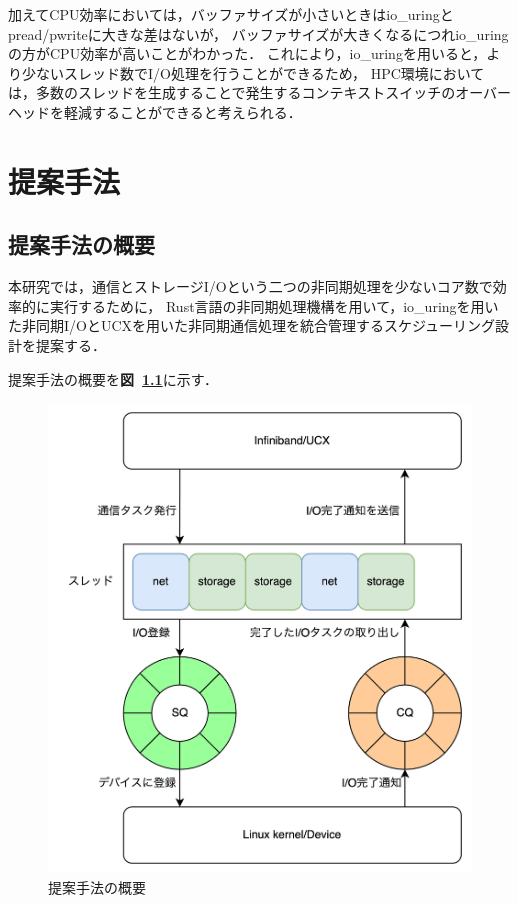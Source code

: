 \documentclass[a4paper,11pt,openany]{jreport}
\newcommand\figref[1]{\textbf{図~\ref{fig:#1}}}
\begin{document}
加えてCPU効率においては，バッファサイズが小さいときはio\_uringとpread/pwriteに大きな差はないが，
バッファサイズが大きくなるにつれio\_uringの方がCPU効率が高いことがわかった．
これにより，io\_uringを用いると，より少ないスレッド数でI/O処理を行うことができるため，
HPC環境においては，多数のスレッドを生成することで発生するコンテキストスイッチのオーバーヘッドを軽減することができると考えられる．

\chapter{提案手法}
\section{提案手法の概要}
本研究では，通信とストレージI/Oという二つの非同期処理を少ないコア数で効率的に実行するために，
Rust言語の非同期処理機構を用いて，io\_uringを用いた非同期I/OとUCXを用いた非同期通信処理を統合管理するスケジューリング設計を提案する．

提案手法の概要を\figref{proposed}に示す．
\begin{figure}
	\centering
	\includegraphics[width=12cm, bb=0 0 2260 2505]{figures/io_net_integrate.drawio.png}
	\caption{提案手法の概要}
	\label{fig:proposed}
\end{figure}
\end{document}
